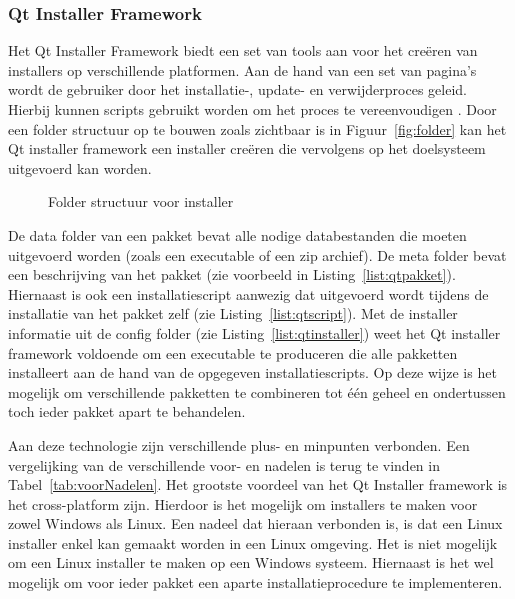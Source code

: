 \subsubsection{Qt Installer Framework}
Het Qt Installer Framework biedt een set van tools aan voor het creëren van installers op verschillende platformen.
Aan de hand van een set van pagina's wordt de gebruiker door het installatie-, update- en verwijderproces geleid.
Hierbij kunnen scripts gebruikt worden om het proces te vereenvoudigen \citep{qtDoc}.
Door een folder structuur op te bouwen zoals zichtbaar is in Figuur~\vref{fig:folder} kan het Qt installer framework een installer creëren die vervolgens op het doelsysteem uitgevoerd kan worden.

\begin{figure}[!ht]
\centering
{}
\caption{Folder structuur voor installer}
\label{fig:folder}
\end{figure}

De data folder van een pakket bevat alle nodige databestanden die moeten uitgevoerd worden (zoals een executable of een zip archief).
De meta folder bevat een beschrijving van het pakket (zie voorbeeld in Listing~\vref{list:qtpakket}).
Hiernaast is ook een installatiescript aanwezig dat uitgevoerd wordt tijdens de installatie van het pakket zelf (zie Listing~\vref{list:qtscript}).
Met de installer informatie uit de config folder (zie Listing~\vref{list:qtinstaller}) weet het Qt installer framework voldoende om een executable te produceren die alle pakketten installeert aan de hand van de opgegeven installatiescripts.
Op deze wijze is het mogelijk om verschillende pakketten te combineren tot één geheel en ondertussen toch ieder pakket apart te behandelen.

Aan deze technologie zijn verschillende plus- en minpunten verbonden.
Een vergelijking van de verschillende voor- en nadelen is terug te vinden in Tabel~\ref{tab:voorNadelen}.
Het grootste voordeel van het Qt Installer framework is het cross-platform zijn.
Hierdoor is het mogelijk om installers te maken voor zowel Windows als Linux.
Een nadeel dat hieraan verbonden is, is dat een Linux installer enkel kan gemaakt worden in een Linux omgeving.
Het is niet mogelijk om een Linux installer te maken op een Windows systeem.
Hiernaast is het wel mogelijk om voor ieder pakket een aparte installatieprocedure te implementeren.


